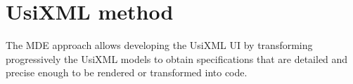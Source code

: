 \section{UsiXML method}
\label{section:usixml_method}

The MDE approach allows developing the UsiXML UI by transforming progressively the UsiXML models to obtain specifications that are detailed and precise enough to be rendered or transformed into code.



